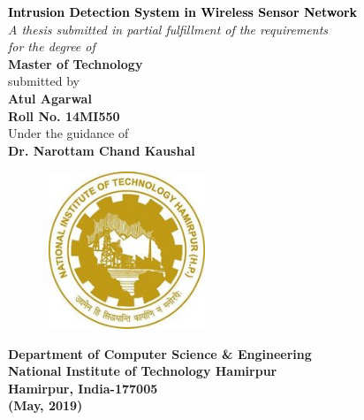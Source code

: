 \thispagestyle{empty}
\graphicspath{{Figures/PNG/}{Figures/}}
\begin{center}
	\vspace{8mm}
	\Large \textcolor{black}{\textbf{Intrusion Detection System in Wireless Sensor Network}}\\
	\vspace{10mm}
	\large \textit{A thesis submitted in partial fulfillment of the requirements \\ for the degree of} \\
	\vspace{8mm}
	\Large {\textbf{Master of Technology}} \\
    \vspace{8mm}
    \large submitted by \\
    \vspace{8mm}
	\textbf{{\Large Atul Agarwal} \\ {\large Roll No. 14MI550}} \\
	\vspace{6mm}
	\large Under the guidance of \\
	\Large \textbf{Dr. Narottam Chand Kaushal}
	\vspace{5mm}
	\begin{figure}[h!]
		\centering
		\includegraphics[height=4.7cm,width=5cm]{h}
	\end{figure}
	\par\vspace{5mm}
	\large \textbf{Department of Computer Science \& Engineering\\
			National Institute of Technology Hamirpur\\
			Hamirpur, India-177005 \\
			(May, 2019)}
\end{center}
\thispagestyle{empty}

